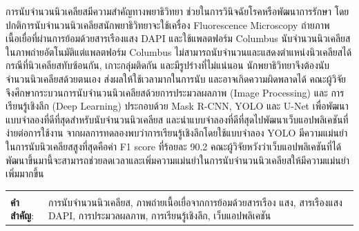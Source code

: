 \documentclass[12pt,oneside,openright,a4paper]{cpe-thai-project}
\begin{document}
\thaiabstract
การนับจำนวนนิวเคลียสมีความสำคัญทางพยาธิวิทยา ช่วยในการวินิจฉัยโรคหรือพัฒนาการรักษา โดยปกติการนับจำนวนนิวเคลียสนักพยาธิวิทยาจะใช้เครื่อง Fluorescence Microscopy ถ่ายภาพเนื้อเยื่อที่ผ่านการย้อมด้วยสารเรืองแสง DAPI และใช้แพลตฟอร์ม Columbus นับจำนวนนิวเคลียสในภาพถ่ายอัตโนมัติแต่แพลตฟอร์ม Columbus ไม่สามารถนับจำนวนและแสดงตำแหน่งนิวเคลียสได้กรณีที่นิวเคลียสทับซ้อนกัน, เกาะกลุ่มติดกัน และมีรูปร่างที่ไม่แน่นอน นักพยาธิวิทยาจึงต้องนับจำนวนนิวเคลียสด้วยตนเอง ส่งผลให้ใช้เวลามากในการนับ และอาจเกิดความผิดพลาดได้ คณะผู้วิจัยจึงศึกษากระบวนการนับจำนวนนิวเคลียสด้วยการประมวลผลภาพ (Image Processing) และ การเรียนรู้เชิงลึก (Deep Learning) ประกอบด้วย Mask R-CNN, YOLO และ U-Net เพื่อพัฒนาแบบจำลองที่ดีที่สุดสำหรับนับจำนวนนิวเคลียส และนำแบบจำลองที่ดีที่สุดไปพัฒนาเว็บแอปพลิเคชันที่ง่ายต่อการใช้งาน จากผลการทดลองพบว่าการเรียนรู้เชิงลึกโดยใช้แบบจำลอง YOLO มีความแม่นยำในการนับนิวเคลียสสูงที่สุดคือค่า F1 score ที่ร้อยละ 90.2 
คณะผู้วิจัยหวังว่าเว็บแอปพลิเคชันที่ได้พัฒนาขึ้นมานี้จะสามารถช่วยลดเวลาและเพิ่มความแม่นยำในการนับจำนวนนิวเคลียสให้มีความแม่นยำเพิ่มมากขึ้น 

\begin{flushleft}
\begin{tabular*}{\textwidth}{@{}lp{}}
 & \\

\textbf{คำสำคัญ}: & การนับจำนวนนิวเคลียส, ภาพถ่ายเนื้อเยื่อจากการย้อมด้วยสารเรือง
แสง, สารเรืองแสง DAPI, การประมวลผลภาพ, การเรียนรู้เชิงลึก, เว็บแอปพลิเคชัน
\end{tabular*}
\end{flushleft}
\endabstract
\end{document}
